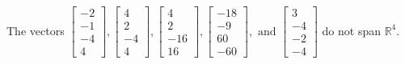 \begin{exercise}
\begin{exerciseStatement}
  \end{exerciseStatement}
  \begin{exerciseAnswer}
   The vectors \(\left[\begin{array}{r}
-2 \\
-1 \\
-4 \\
4
\end{array}\right] , \left[\begin{array}{r}
4 \\
2 \\
-4 \\
4
\end{array}\right] , \left[\begin{array}{r}
4 \\
2 \\
-16 \\
16
\end{array}\right] , \left[\begin{array}{r}
-18 \\
-9 \\
60 \\
-60
\end{array}\right] , \text{ and } \left[\begin{array}{r}
3 \\
-4 \\
-2 \\
-4
\end{array}\right]\) 
  	 do not  
	span \(\mathbb{R}^4\).
  


  \end{exerciseAnswer}
\end{exercise}